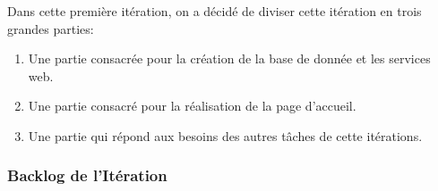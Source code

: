 Dans cette première itération, on a décidé de diviser cette itération en trois
grandes parties:

\begin{enumerate}
 \item Une partie consacrée pour la création de la base de donnée et les
     services web.
 \item Une partie consacré pour la réalisation de la page d'accueil.
 \item Une partie qui répond aux besoins des autres tâches de cette itérations.
\end{enumerate}

\subsubsection{Backlog de l'Itération}

